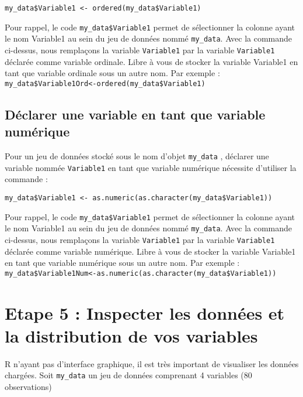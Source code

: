 \documentclass[
]{book}
\begin{document}
\texttt{my\_data\$Variable1\ \textless{}-\ ordered(my\_data\$Variable1)}

Pour rappel, le code \texttt{my\_data\$Variable1} permet de sélectionner la colonne ayant le nom Variable1 au sein du jeu de données nommé \texttt{my\_data}. Avec la commande ci-dessus, nous remplaçons la variable \texttt{Variable1} par la variable \texttt{Variable1} déclarée comme variable ordinale. Libre à vous de stocker la variable Variable1 en tant que variable ordinale sous un autre nom.
Par exemple :
\texttt{my\_data\$Variable1Ord\textless{}-ordered(my\_data\$Variable1)}

\hypertarget{duxe9clarer-une-variable-en-tant-que-variable-numuxe9rique}{%
\subsection{Déclarer une variable en tant que variable numérique}\label{duxe9clarer-une-variable-en-tant-que-variable-numuxe9rique}}

Pour un jeu de données stocké sous le nom d'objet \texttt{my\_data} , déclarer une variable nommée \texttt{Variable1} en tant que variable numérique nécessite d'utiliser la commande :

\texttt{my\_data\$Variable1\ \textless{}-\ as.numeric(as.character(my\_data\$Variable1))}

Pour rappel, le code \texttt{my\_data\$Variable1} permet de sélectionner la colonne ayant le nom Variable1 au sein du jeu de données nommé \texttt{my\_data}. Avec la commande ci-dessus, nous remplaçons la variable \texttt{Variable1} par la variable \texttt{Variable1} déclarée comme variable numérique. Libre à vous de stocker la variable Variable1 en tant que variable numérique sous un autre nom.
Par exemple :
\texttt{my\_data\$Variable1Num\textless{}-as.numeric(as.character(my\_data\$Variable1))}

\hypertarget{etape-5-inspecter-les-donnuxe9es-et-la-distribution-de-vos-variables}{%
\section{Etape 5 : Inspecter les données et la distribution de vos variables}\label{etape-5-inspecter-les-donnuxe9es-et-la-distribution-de-vos-variables}}

R n'ayant pas d'interface graphique, il est très important de visualiser les données chargées. Soit \texttt{my\_data} un jeu de données comprenant 4 variables (80 observations)
\end{document}
